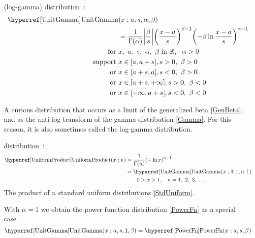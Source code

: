 


\label{sec:UnitGamma}
 (log-gamma) distribution~\cite{Olshen1938,Consul1971,Grassia1977,Gupta2004}:
\begin{align}
\label{UnitGamma}
\opr{UnitGamma}&(x\given a, s,\alpha,\beta) \\ \notag &= \frac{1}{\Gamma(\alpha)} \Left|\frac{\beta}{ s}\Right|
\Left(\frac{x-a}{s}\Right)^{\beta-1} \Left(-\beta \ln   \frac{x-a}{s} \Right)^{\alpha-1}  \checked
\notag
\\ \text{for }& x,\ a,\ s,\ \alpha,\ \beta \text{ in } \mathbb{R},\ \ \alpha >0
\notag
 \\ \text{ support } & x \in [a,a+s], s>0,\ \beta>0 \notag \\ \text{ or } &  x\in[a+s,a], s<0,\ \beta>0 
 \notag 
 \\  \notag  \text{ or } &  x\in[a+s,+\infty], s>0,\ \beta<0 
 \\  \notag  \text{ or } &  x\in[-\infty,a+s], s<0,\ \beta<0 
\end{align}

A curious distribution that occurs as a limit of the generalized beta \eqref{GenBeta}, and as the anti-log transform of the gamma distribution \eqref{Gamma}. For this reason, it is also sometimes called the log-gamma distribution.





 distribution~\cite{Springer1979a}:
\begin{align}
\label{UniformProduct}
\opr{UniformProduct}(x\given n) &=  \frac{1}{\Gamma(n)} \Left( -\ln x \Right)^{n-1} 	\checked
 \\ \notag & = \opr{UnitGamma}(x\given 0, 1,n,1)							\checked
 \\ \notag & \qquad 0>x>1, \quad n = 1,\ 2,\ 3,\ \ldots							\checked
\end{align}
The product of $n$ standard uniform distributions \eqref{StdUniform}.



With  $\alpha=1$ we obtain the power function distribution \eqref{PowerFn} as a special case.
\[
\opr{UnitGamma}(x\given a, s,1,\beta) = \opr{PowerFn}(x\given a,s,\beta) \checked \notag
\]

